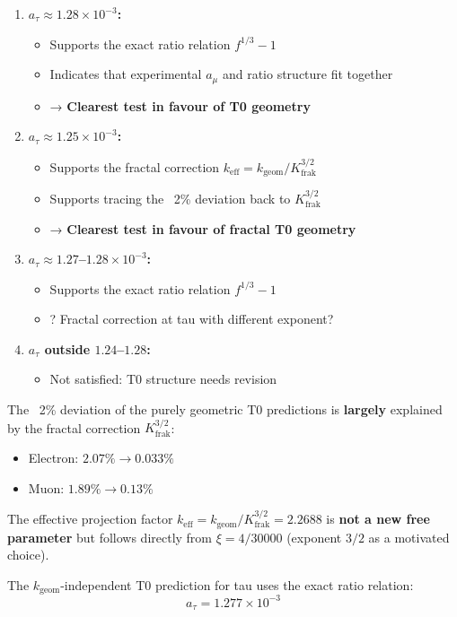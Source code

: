 	\begin{enumerate}
		\item \textbf{$a_\tau \approx 1.28 \times 10^{-3}$:}
		\begin{itemize}
			\item Supports the exact ratio relation $f^{1/3} - 1$
			\item Indicates that experimental $a_\mu$ and ratio structure fit together
			\item → \textbf{Clearest test in favour of T0 geometry}
		\end{itemize}
		
		\item \textbf{$a_\tau \approx 1.25 \times 10^{-3}$:}
		\begin{itemize}
			\item Supports the fractal correction $k_{\text{eff}} = k_\text{geom}/K_\text{frak}^{3/2}$
			\item Supports tracing the ~2\% deviation back to $K_\text{frak}^{3/2}$
			\item → \textbf{Clearest test in favour of fractal T0 geometry}
		\end{itemize}
		
		\item \textbf{$a_\tau \approx 1.27$--$1.28 \times 10^{-3}$:}
		\begin{itemize}
			\item Supports the exact ratio relation $f^{1/3} - 1$
			\item ? Fractal correction at tau with different exponent?
		\end{itemize}
		
		\item \textbf{$a_\tau$ outside $1.24$--$1.28$:}
		\begin{itemize}
			\item Not satisfied: T0 structure needs revision
		\end{itemize}
	\end{enumerate}
	
	\begin{keypoint}
		The ~2\% deviation of the purely geometric T0 predictions is \textbf{largely} explained by the fractal correction $K_\text{frak}^{3/2}$:
		\begin{itemize}
			\item Electron: $2.07\% \to 0.033\%$
			\item Muon: $1.89\% \to 0.13\%$
		\end{itemize}
		
		The effective projection factor $k_\text{eff} = k_\text{geom}/K_\text{frak}^{3/2} = 2.2688$ is \textbf{not a new free parameter} but follows directly from $\xi = 4/30000$ (exponent $3/2$ as a motivated choice).
		
		The $k_{\text{geom}}$-independent T0 prediction for tau uses the exact ratio relation:
		\begin{equation}
			\boxed{a_\tau = 1.277 \times 10^{-3}}
		\end{equation}
	\end{keypoint}
	
